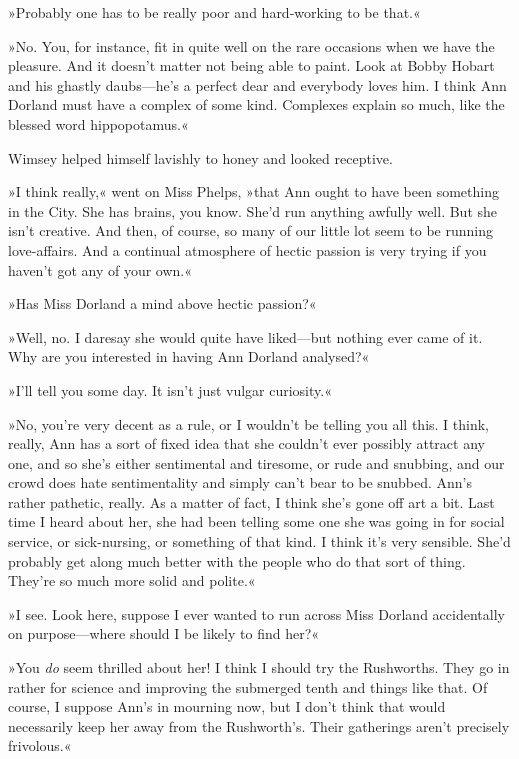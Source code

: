 »Probably one has to be really poor and hard-working to be that.«

»No. You, for instance, fit in quite well on the rare occasions when we have the pleasure. And it doesn't matter not being able to paint. Look at Bobby Hobart and his ghastly daubs\allowbreak---\allowbreak he's a perfect dear and everybody loves him. I think Ann Dorland must have a complex of some kind. Complexes explain so much, like the blessed word hippopotamus.«

Wimsey helped himself lavishly to honey and looked receptive.

»I think really,« went on Miss Phelps, »that Ann ought to have been something in the City. She has brains, you know. She'd run anything awfully well. But she isn't creative. And then, of course, so many of our little lot seem to be running love-affairs. And a continual atmosphere of hectic passion is very trying if you haven't got any of your own.«

»Has Miss Dorland a mind above hectic passion?«

»Well, no. I daresay she would quite have liked\allowbreak---\allowbreak but nothing ever came of it. Why are you interested in having Ann Dorland analysed?«

»I'll tell you some day. It isn't just vulgar curiosity.«

»No, you're very decent as a rule, or I wouldn't be telling you all this. I think, really, Ann has a sort of fixed idea that she couldn't ever possibly attract any one, and so she's either sentimental and tiresome, or rude and snubbing, and our crowd does hate sentimentality and simply can't bear to be snubbed. Ann's rather pathetic, really. As a matter of fact, I think she's gone off art a bit. Last time I heard about her, she had been telling some one she was going in for social service, or sick-nursing, or something of that kind. I think it's very sensible. She'd probably get along much better with the people who do that sort of thing. They're so much more solid and polite.«

»I see. Look here, suppose I ever wanted to run across Miss Dorland accidentally on purpose\allowbreak---\allowbreak where should I be likely to find her?«

»You \textit{do} seem thrilled about her! I think I should try the Rushworths. They go in rather for science and improving the submerged tenth and things like that. Of course, I suppose Ann's in mourning now, but I don't think that would necessarily keep her away from the Rushworth's. Their gatherings aren't precisely frivolous.«

